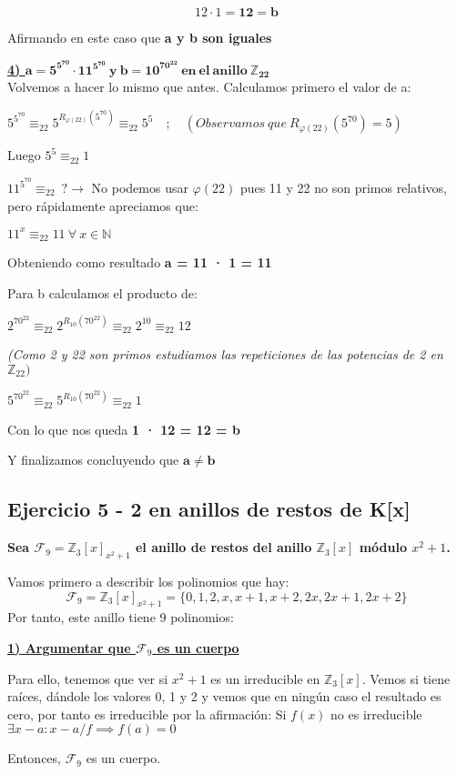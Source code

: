 \documentclass[11pt, a4paper, titlepage]{article}
\providecommand{\ent}{\mathbb{Z}}
\begin{document}
$$12 \cdot 1 = \mathbf{12 = b}  $$

Afirmando en este caso que \textbf{a y b son iguales}


\textbf{\underline{4) $\mathbf{a = 5^{5^{70}} \cdot 11^{5^{70}}\ y\ b = 10^{70^{22}}\ en\ el\ anillo\ \ent_{22} }$}}\\

Volvemos a hacer lo mismo que antes. Calculamos primero el valor de a:

$5^{5^{70}} \equiv_{22} 5^{R_{\varphi(22)}(5^{70})}\equiv_{22}5^5\quad ;\quad (Observamos\ que\ R_{\varphi(22)}(5^{70}) = 5)$

Luego $5^5 \equiv_{22}1$

$11^{5^{70}}\equiv_{22}\ ?\rightarrow$ No podemos usar $\varphi(22)$ pues 11 y 22 no son primos relativos, pero rápidamente apreciamos que:

$11^x \equiv_{22} 11\ \forall\ x \in \mathbb{N}$

Obteniendo como resultado \textbf{a = 11 · 1 = 11}

Para b calculamos el producto de:

$2^{70^{22}}\equiv_{22}2^{R_{10}(70^{22})}\equiv_{22}2^{10}\equiv_{22}12$
 
\emph{(Como 2 y 22 son primos estudiamos las repeticiones de las potencias de 2 en $\ent_{22})$}

$5^{70^{22}}\equiv_{22}5^{R_{10}(70^{22})}\equiv_{22}1$

Con lo que nos queda \textbf{1 · 12 = 12 = b}

Y finalizamos concluyendo que $\mathbf{a \neq b}$




\subsection{\LARGE{Ejercicio 5 - 2 en anillos de restos de K[x]}} 

\textbf{Sea $\mathcal{F}_9 = \ent_3[x]_{ x^2 +1}$ el anillo de restos del anillo $\ent_3[x]$ módulo $x^2 +1$.}


Vamos primero a describir los polinomios que hay:
\[
\mathcal{F}_9 =\ent_3[x]_{x^2+1}= \{0,1,2,x,x+1,x+2,2x,2x+1,2x+2\}
\]
Por tanto, este anillo tiene 9 polinomios:

\underline{\textbf{1) Argumentar que $\mathcal{F}_9$ es un cuerpo}}

Para ello, tenemos que ver si $x^2+1$ es un irreducible en $\ent_3[x]$. Vemos si tiene raíces, dándole los valores 0, 1 y 2 y vemos que en ningún caso el resultado es cero, por tanto es irreducible por la afirmación: Si $f(x)$ no es irreducible $\exists x-a : x-a/f \implies f(a) = 0$

Entonces, $\mathcal{F}_9$ es un cuerpo.
\end{document}
